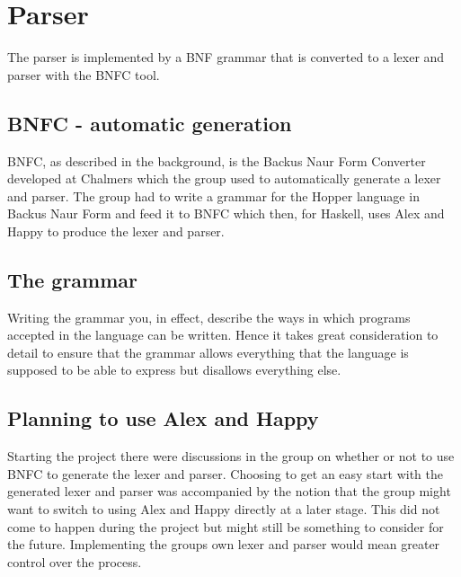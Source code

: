 \section{Parser}

The parser is implemented by a BNF grammar that is converted to a lexer and 
parser with the BNFC tool. 

\subsection{BNFC - automatic generation}

BNFC, as described in the background, is the Backus Naur Form Converter developed at Chalmers which the group used to automatically generate a lexer and parser. The group had to write a grammar for the Hopper language in Backus Naur Form and feed it to BNFC which then, for Haskell, uses Alex and Happy to produce the lexer and parser.

\subsection{The grammar}

Writing the grammar you, in effect, describe the ways in which programs accepted in the language can be written. Hence it takes great consideration to detail to ensure that the grammar allows everything that the language is supposed to be able to express but disallows everything else.


\subsection{Planning to use Alex and Happy}

Starting the project there were discussions in the group on whether or not to use BNFC to generate the lexer and parser. Choosing to get an easy start with the generated lexer and parser was accompanied by the notion that the group might want to switch to using Alex and Happy directly at a later stage. This did not come to happen during the project but might still be something to consider for the future. Implementing the groups own lexer and parser would mean greater control over the process.


